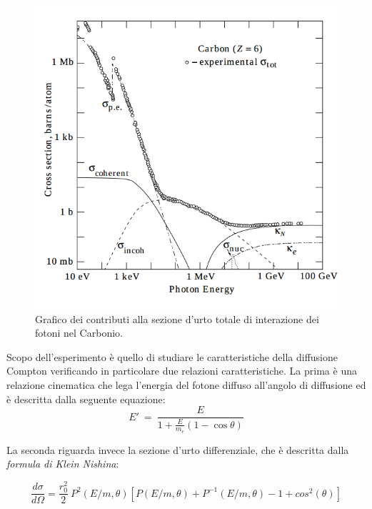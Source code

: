 \documentclass[8pt]{extarticle}
\begin{document}
\begin{figure}
\begin{center}
\includegraphics[scale=0.5]{cross_sections}
\caption{Grafico dei contributi alla sezione d'urto totale di interazione dei fotoni nel Carbonio.}
\label{fig:cross_sections}
\end{center}
\end{figure}

Scopo dell'esperimento è quello di studiare le caratteristiche della diffusione Compton verificando in particolare due relazioni caratteristiche. La prima è una relazione cinematica che lega l'energia del fotone diffuso all'angolo di diffusione ed è descritta dalla seguente equazione: \\

\begin{equation}
E'\ = \ \frac{E}{1+\frac{E}{m_e}\left(1-\cos{\theta}\right)}
\label{eq:en_ang}
\end{equation}

La seconda riguarda invece la sezione d'urto differenziale, che è descritta dalla \textit{formula di Klein Nishina}:

\begin{equation}
\frac{d\sigma}{d\Omega} = \frac{r_0 ^2}{2} \ P^2(E/m , \theta) \left[ P(E/m, \theta) + P^{-1} (E/m, \theta) -1 + cos^2(\theta)\right]
\label{eq:klein}
\end{equation}
\end{document}
